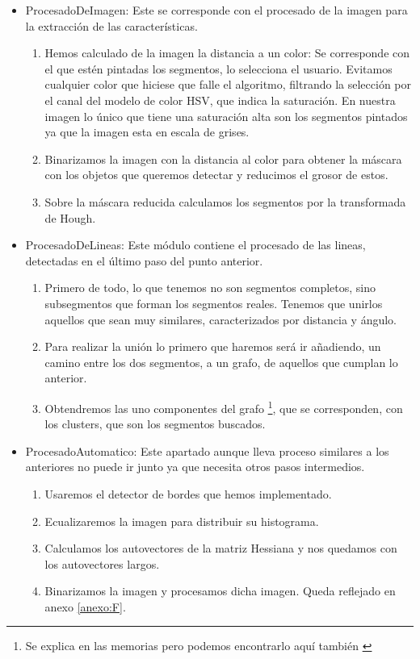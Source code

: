 \begin{itemize}
\item ProcesadoDeImagen: Este se corresponde con el procesado de la imagen para la extracción de las características.
	\begin{enumerate}

	\item Hemos calculado de la imagen la distancia a un color: Se corresponde con el que estén pintadas los segmentos, lo selecciona el usuario. Evitamos cualquier color que hiciese que falle el algoritmo, filtrando la selección por el canal del modelo de color HSV, que indica la saturación. En nuestra imagen lo único que tiene una saturación alta son los segmentos pintados ya que la imagen esta en escala de grises.

	\item Binarizamos la imagen con la distancia al color para obtener la máscara con los objetos que queremos detectar y reducimos el grosor de estos.

	\item Sobre la máscara reducida calculamos los segmentos por la transformada de Hough.
	\end{enumerate}

\item ProcesadoDeLineas: Este módulo contiene el procesado de las lineas, detectadas en el último paso del punto anterior.
\begin{enumerate}

\item Primero de todo, lo que tenemos no son segmentos completos, sino subsegmentos que forman los segmentos reales. Tenemos que unirlos aquellos que sean muy similares, caracterizados por distancia y ángulo.

\item Para realizar la unión lo primero que haremos será ir añadiendo, un camino entre los dos segmentos, a un grafo, de aquellos que cumplan lo anterior.

\item Obtendremos las uno componentes del grafo \footnote{Se explica en las memorias pero podemos encontrarlo aquí también \cite{Wiki:Grafos}}, que se corresponden, con los clusters, que son los segmentos buscados.
\end{enumerate}

\item ProcesadoAutomatico: Este apartado aunque lleva proceso similares a los anteriores no puede ir junto ya que necesita otros pasos intermedios.
\begin{enumerate}

\item Usaremos el detector de bordes que hemos implementado.
\item Ecualizaremos la imagen para distribuir su histograma.
\item Calculamos los autovectores de la matriz Hessiana y nos quedamos con los autovectores largos.
\item Binarizamos la imagen y procesamos dicha imagen. Queda reflejado en anexo \ref{anexo:F}.
\end{enumerate}

\end{itemize}

